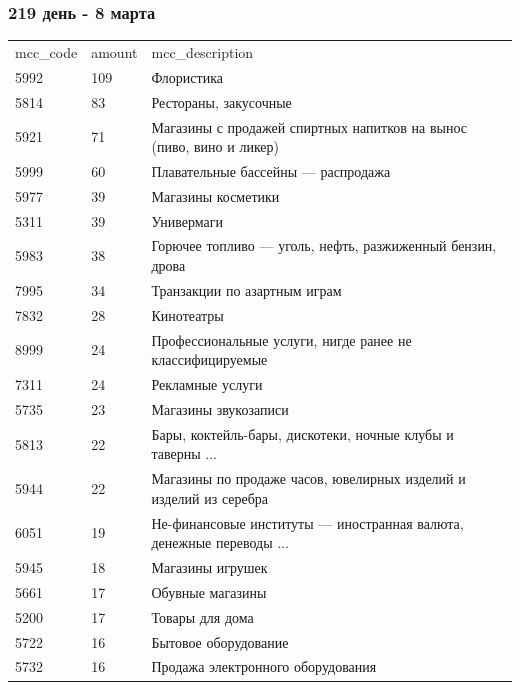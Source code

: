 \documentclass{beamer}
\begin{document}
\begin{frame}
\frametitle{219 день - 8 марта}

\begin{adjustbox}{width=1\textwidth}
\begin{tabular}{lll}
    mcc\_code & amount & mcc\_description                                                    \\
    5992      & 109    & Флористика                                                          \\
    5814      & 83     & Рестораны, закусочные                                               \\
    5921      & 71     & Магазины с продажей спиртных напитков на вынос (пиво, вино и ликер) \\
    5999      & 60     & Плавательные бассейны — распродажа                                  \\
    5977      & 39     & Магазины косметики                                                  \\
    5311      & 39     & Универмаги                                                          \\
    5983      & 38     & Горючее топливо — уголь, нефть, разжиженный бензин, дрова           \\
    7995      & 34     & Транзакции по азартным играм                                        \\
    7832      & 28     & Кинотеатры                                                          \\
    8999      & 24     & Профессиональные услуги, нигде ранее не классифицируемые            \\
    7311      & 24     & Рекламные услуги                                                    \\
    5735      & 23     & Магазины звукозаписи                                                \\
    5813      & 22     & Бары, коктейль-бары, дискотеки, ночные клубы и таверны ...          \\
    5944      & 22     & Магазины по продаже часов, ювелирных изделий и изделий из серебра   \\
    6051      & 19     & Не-финансовые институты — иностранная валюта, денежные переводы ... \\
    5945      & 18     & Магазины игрушек                                                    \\
    5661      & 17     & Обувные магазины                                                    \\
    5200      & 17     & Товары для дома                                                     \\
    5722      & 16     & Бытовое оборудование                                                \\
    5732      & 16     & Продажа электронного оборудования
\end{tabular}
\end{adjustbox}

\end{frame}
\end{document}
